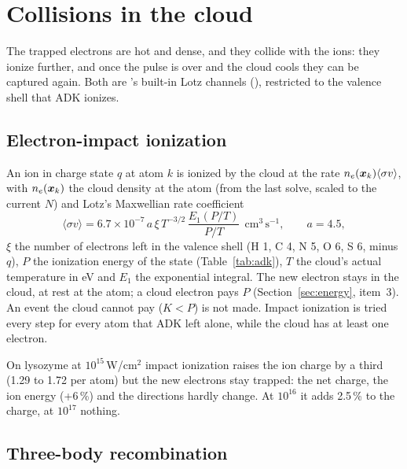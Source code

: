 \chapter{Collisions in the cloud}
\label{ch:coll}


The trapped electrons are hot and dense, and they collide with the ions: they ionize further, and once the pulse is
over and the cloud cools they can be captured again.
Both are 's built-in Lotz channels (), restricted to the valence shell that
ADK ionizes.

\section{Electron-impact ionization}

An ion in charge state $q$ at atom $k$ is ionized by the cloud at the rate $n_e(\bm{x}_k)\langle\sigma v\rangle$, with
$n_e(\bm{x}_k)$ the cloud density at the atom (from the last solve, scaled to the current $N$) and Lotz's Maxwellian
rate coefficient~\cite{lotz1968}
\begin{equation}
  \langle\sigma v\rangle = 6.7\times10^{-7}\,a\,\xi\,T^{-3/2}\,\frac{E_1(P/T)}{P/T}\ \ \mathrm{cm^3\,s^{-1}},\qquad a = 4.5,
\end{equation}
$\xi$ the number of electrons left in the valence shell (H 1, C 4, N 5, O 6, S 6, minus $q$), $P$ the ionization
energy of the state (Table~\ref{tab:adk}), $T$ the cloud's actual temperature in eV and $E_1$ the exponential integral.
The new electron stays in the cloud, at rest at the atom; a cloud electron pays $P$
(Section~\ref{sec:energy}, item~3).
An event the cloud cannot pay ($K<P$) is not made.
Impact ionization is tried every step for every atom that ADK left alone, while the cloud has at least one electron.

On lysozyme at $10^{15}$\,W/cm$^2$ impact ionization raises the ion charge by a third (1.29 to 1.72 per atom) but the new
electrons stay trapped: the net charge, the ion energy (+6\,\%) and the directions hardly change.
At $10^{16}$ it adds 2.5\,\% to the charge, at $10^{17}$ nothing.

\section{Three-body recombination}
\label{sec:recombination}

